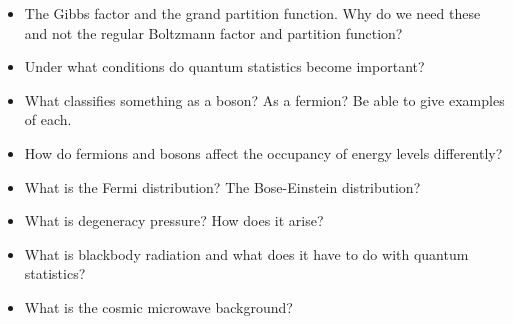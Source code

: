 \vspace{0.2cm}
\begin{itemize}[itemsep=0pt,parsep=0pt,topsep=0pt,partopsep=0pt]
\item The Gibbs factor and the grand partition function.
Why do we need these and not the regular Boltzmann factor
and partition function?
\item Under what conditions do quantum statistics become important?
\item What classifies something as a boson? As a fermion? Be able
to give examples of each.
\item How do fermions and bosons affect the occupancy of energy
levels differently?
\item What is the Fermi distribution? The Bose-Einstein
distribution?
\item What is degeneracy pressure? How does it arise?
\item What is blackbody radiation and what does it have to do
with quantum statistics?
\item What is the cosmic microwave background?
\end{itemize}



